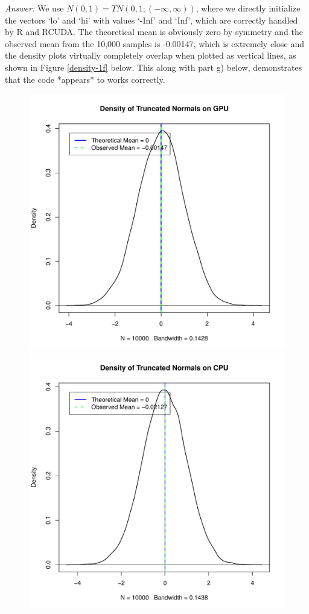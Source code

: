\documentclass[a4paper, 11pt]{report}
\begin{document}
\begin{enumerate}[a)]
			\noindent \textit{Answer:} We use $N(0,1) = TN(0,1;(-\infty, \infty))$, where we directly initialize the vectors `lo' and `hi' with values `-Inf' and `Inf', which are correctly handled by R and RCUDA.  The theoretical mean is obviously zero by symmetry and the observed mean from the 10,000 samples is -0.00147, which is extremely close and the density plots virtually completely overlap when plotted as vertical lines, as shown in Figure \ref{density-1f} below.  This along with part g) below, demonstrates that the code *appears* to works correctly.
				\vspace*{-12pt}
				\begin{figure}[H]
					\centering
					\includegraphics[scale=0.5]{density-1f.pdf}
					\includegraphics[scale=0.5]{density-1f-cpu.pdf}

\end{figure}
\end{enumerate}
\end{document}
